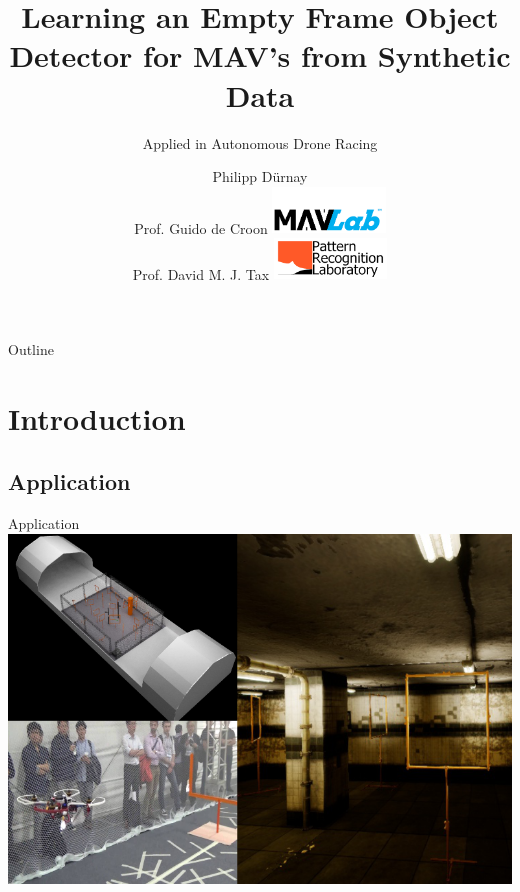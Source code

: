 \documentclass{beamer}
\title{Learning an Empty Frame Object Detector for MAV's from Synthetic Data} %
\subtitle{Applied in Autonomous Drone Racing} %
\author{Philipp Dürnay\\ \bigskip \bigskip Prof. Guido de Croon \hfill	\includegraphics[width=3cm]{fig/mavlab}\\
	 Prof. David M. J. Tax  \hfill \includegraphics[width=3cm]{fig/prgroup}%
}
\begin{document}
  \frame{\maketitle}


  \begin{darkframes}
  	\begin{frame}{Outline}
  		\tableofcontents
  	\end{frame}
	\section{Introduction}
	\subsection{Application}
    \begin{frame}{Application}
    	\includegraphics[width=\textwidth]{fig/application}
    \end{frame}


\end{darkframes}
\end{document}
